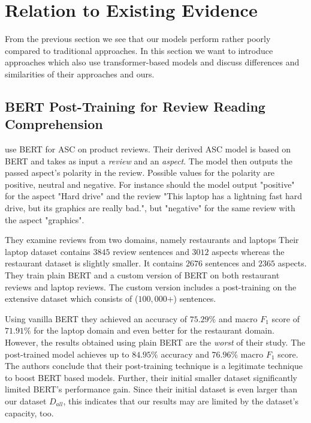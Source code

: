 \chapter{Relation to Existing Evidence}
\label{chp:relation_to_existing_evidence}
From the previous section we see that our models perform rather poorly compared to traditional approaches.
In this section we want to introduce approaches which also use transformer-based models and discuss differences and similarities of their approaches and ours.

\section{BERT Post-Training for Review Reading Comprehension}
\Textcite{Xu:2019} use \ac{BERT} for \ac{ASC} on product reviews.
Their derived \ac{ASC} model is based on \ac{BERT} and takes as input a \textit{review} and an \textit{aspect}.
The model then outputs the passed aspect's polarity in the review.
Possible values for the polarity are positive, neutral and negative.
For instance should the model output "positive" for the aspect "Hard drive" and the review "This laptop has a lightning fast hard drive, but its graphics are really bad.", but "negative" for the same review with the aspect "graphics".

They examine reviews from two domains, namely restaurants and laptops
Their laptop dataset contains $3845$ review sentences and $3012$ aspects whereas the restaurant dataset is slightly smaller.
It contains $2676$ sentences and $2365$ aspects.
They train plain \ac{BERT} and a custom version of \ac{BERT} on both restaurant reviews and laptop reviews.
The custom version includes a post-training on the extensive dataset which consists of ($100,000$+) sentences.

Using vanilla \ac{BERT} they achieved an accuracy of $75.29\%$ and macro $F_1$ score of $71.91\%$ for the laptop domain and even better for the restaurant domain.
However, the results obtained using plain \ac{BERT} are the \textit{worst} of their study.
The post-trained model achieves up to $84.95\%$ accuracy and $76.96\%$ macro $F_1$ score.
The authors conclude that their post-training technique is a legitimate technique to boost \ac{BERT} based models.
Further, their initial smaller dataset significantly limited \ac{BERT}'s performance gain.
Since their initial dataset is even larger than our dataset $D_{all}$, this indicates that our results may are limited by the dataset's capacity, too.

